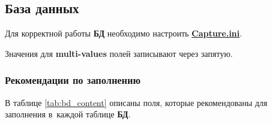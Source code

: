 \newpage
\subsection{База данных} \label{ssec:bd}

Для корректной работы \textbf{БД} необходимо настроить \hyperref[ssec:capture_ini]{\textbf{Capture.ini}}.

Значения для \textbf{multi-values} полей записывают через запятую.

\subsubsection{Рекомендации по заполнению} \label{sssec:bd_contet}
В таблице \ref{tab:bd_content} описаны поля, которые рекомендованы для заполнения в~каждой таблице \textbf{БД}.

